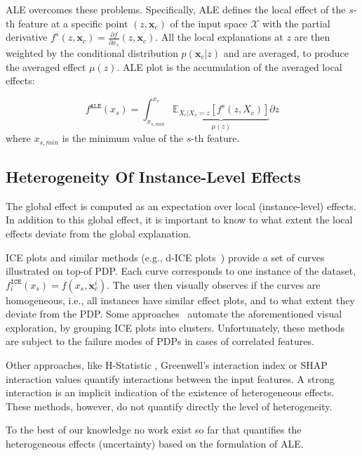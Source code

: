 \documentclass[twoside]{article}
\newcommand{\xc}{\mathbf{x}_c}
\begin{document}
ALE overcomes these problems. Specifically, ALE defines the local effect of the \(s\)-th feature at a specific point \((z, \xc)\) of the input space \(\mathcal{X}\) with the partial derivative \(f^s(z, \xc) = \frac{\partial f}{\partial x_s} (z, \xc)\). All the local explanations at \(z\) are then weighted by the conditional distribution \(p(\xc|z)\) and are averaged, to produce the averaged effect \(\mu(z)\). ALE plot is the accumulation of the averaged local effects:

\begin{equation}
  \label{eq:ALE}
  f^{\mathtt{ALE}}(x_s) = \int_{x_{s,min}}^{x_s} \underbrace{\mathbb{E}_{X_c|X_s=z}\left [f^s (z, X_c)\right ]}_{\mu(z)} \partial z
\end{equation}
%
where \(x_{s,min}\) is the minimum value of the \(s\)-th feature.

\subsection{Heterogeneity Of Instance-Level Effects}
\label{sec:quant-heter-effects}

The global effect is computed as an expectation over local (instance-level) effects. In addition to this global effect, it is important to know to what extent the local effects deviate from the global explanation.

ICE plots and similar methods (e.g., d-ICE plots~\citep{goldstein2015peeking}) provide a set of curves illustrated on top-of PDP. Each curve corresponds to one instance of the dataset, \(f^{\mathtt{ICE}}_i(x_s) = f(x_s, \xc^i)\). The user then visually observes if the curves are homogeneous, i.e., all instances have similar effect plots, and to what extent they deviate from the PDP. Some approaches~\citep{herbinger2022repid, britton2019vine, molnar2020model} automate the aforementioned visual exploration, by grouping ICE plots into clusters. Unfortunately, these methods are subject to the failure modes of PDPs in cases of correlated features.

Other approaches, like H-Statistic \citep{friedman2008predictive}, Greenwell's interaction index \citep{greenwell2018simple} or SHAP interaction values \citep{lundberg2018consistent} quantify interactions between the input features. A strong interaction is an implicit indication of the existence of heterogeneous effects. These methods, however, do not quantify directly the level of heterogeneity.

To the best of our knowledge no work exist so far that quantifies the heterogeneous effects (uncertainty) based on the formulation of ALE.
\end{document}
